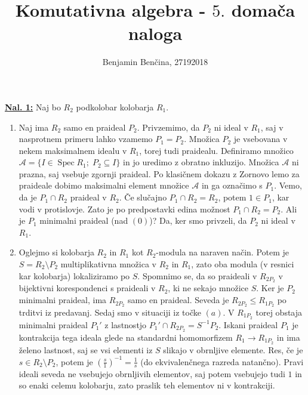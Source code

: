\documentclass[a4paper, 12pt]{article}
\title{Komutativna algebra - $5.$ domača naloga}
\author{Benjamin Benčina, 27192018}
\DeclareMathOperator{\Spec}{Spec}
\begin{document}
\maketitle

\underline{\textbf{Nal. 1:}}
Naj bo $R_2$ podkolobar kolobarja $R_1$.
\begin{enumerate}[label=(\alph*)]
	\item Naj ima $R_2$ samo en praideal $P_2$. Privzemimo, da $P_2$ ni ideal v $R_1$, saj v nasprotnem primeru lahko vzamemo $P_1 = P_2$. Množica $P_2$ je vsebovana v nekem maksimalnem idealu v $R_1$, torej tudi praidealu. Definiramo množico $\mathcal{A} = \lbrace I \in \Spec R_1 ; \; P_2 \subseteq I \rbrace$ in jo uredimo z obratno inkluzijo. Množica $\mathcal{A}$ ni prazna, saj vsebuje zgornji praideal. Po klasičnem dokazu z Zornovo lemo za praideale dobimo maksimalni element množice $\mathcal{A}$ in ga označimo s $P_1$. Vemo, da je $P_1 \cap R_2$ praideal v $R_2$. Če slučajno $P_1 \cap R_2 = R_2$, potem $1 \in P_1$, kar vodi v protislovje. Zato je po predpostavki edina možnost $P_1 \cap R_2 = P_2$. Ali je $P_1$ minimalni praideal (nad $(0)$)? Da, ker smo privzeli, da $P_2$ ni ideal v $R_1$.
	\item Oglejmo si kolobarja $R_2$ in $R_1$ kot $R_2$-modula na naraven način. Potem je $S = R_2 \setminus P_2$ multiplikativna množica v $R_2$ in $R_1$, zato oba modula (v resnici kar kolobarja) lokaliziramo po $S$. Spomnimo se, da so praideali v $R_{2P_2}$ v bijektivni korespondenci s praideali v $R_2$, ki ne sekajo množice $S$. Ker je $P_2$ minimalni praideal, ima $R_{2P_2}$ samo en praideal. Seveda je $R_{2P_2} \leq R_{1P_2}$ po trditvi iz predavanj. Sedaj smo v situaciji iz točke $(a)$. V $R_{1P_2}$ torej obstaja minimalni praideal $P_1'$ z lastnostjo $P_1' \cap R_{2P_2} = S^{-1}P_2$. Iskani praideal $P_1$ je kontrakcija tega ideala glede na standardni homomorfizem $R_1 \to R_{1P_2}$ in ima želeno lastnost, saj se vsi elementi iz $S$ slikajo v obrnljive elemente. Res, če je $s \in R_2 \setminus P_2$, potem je $\left(\frac{s}{1}\right)^{-1} = \frac{1}{s}$ (do ekvivalenčnega razreda natančno). Pravi ideali seveda ne vsebujejo obrnljivih elementov, saj potem vsebujejo tudi $1$ in so enaki celemu kolobarju, zato praslik teh elementov ni v kontrakciji.
\end{enumerate}
\end{document}
